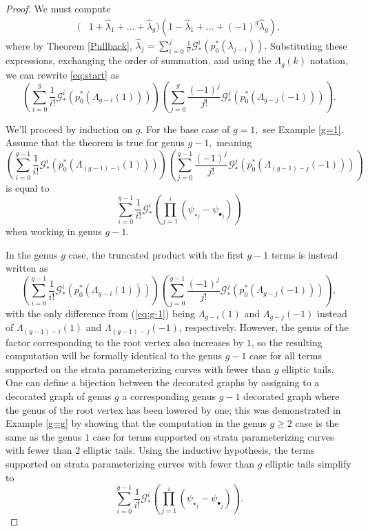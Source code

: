 \documentclass[leqno,12pt]{amsart}
\theoremstyle{remark}
\numberwithin{equation}{section}
\begin{document}
\begin{proof} We must compute
\begin{align} \label{eq:start}
     (&1 + \hat{\lambda}_1 + \dots + \hat{\lambda}_g)(1 - \hat{\lambda}_1 + \dots + (-1)^g\hat{\lambda}_g),
\end{align}
where by Theorem \ref{Pullback}, $\hat{\lambda}_j = \sum_{i=0}^j\frac{1}{i!}\mathcal{G}_*^i(p_0^*(\lambda_{j-i})).$ Substituting these expressions, exchanging the order of summation, and using the $\Lambda_{g}(k)$ notation, we can rewrite \eqref{eq:start}  as  
\begin{equation} \label{eq:big}
\left(\sum_{i=0}^g\frac{1}{i!}\mathcal{G}_*^i(p_0^*(\Lambda_{g-i}(1)))\right)\left(\sum_{j=0}^g\frac{(-1)^j}{j!}\mathcal{G}_*^j(p_0^*(\Lambda_{g-j}(-1)))\right). 
\end{equation}



We'll proceed by induction on $g.$ For the base case of $g = 1,$ see Example \ref{g=1}. Assume that the theorem is true for genus $g - 1,$ meaning 
\begin{equation}\label{eq:g-1}
    \left(\sum_{i=0}^{g-1}\frac{1}{i!}\mathcal{G}_*^i(p_0^*(\Lambda_{(g-1)-i}(1)))\right)\left(\sum_{j=0}^{g-1}\frac{(-1)^j}{j!}\mathcal{G}_*^j(p_0^*(\Lambda_{(g-1)-j}(-1)))\right)
\end{equation}
is equal to  
\begin{equation}\label{eq:induction}
    \sum_{i=0}^{g-1}\frac{1}{i!}\mathcal{G}_*^i\left(\prod_{j=1}^i(\psi_{\star_j}-\psi_{\bullet_j})\right)
\end{equation}
when working in genus $g-1$. 

In the genus $g$ case, the truncated product with the first $g-1$ terms is instead written as
$$
\left(\sum_{i=0}^{g-1}\frac{1}{i!}\mathcal{G}_*^i(p_0^*(\Lambda_{g-i}(1)))\right)\left(\sum_{j=0}^{g-1}\frac{(-1)^j}{j!}\mathcal{G}_*^j(p_0^*(\Lambda_{g-j}(-1)))\right),
$$ 
with the only difference from (\ref{eq:g-1}) being $\Lambda_{g-i}(1)$ and $\Lambda_{g-j}(-1)$ instead of $\Lambda_{(g-1)-i}(1)$ and $\Lambda_{(g-1)-j}(-1)$, respectively. However, the genus of the factor corresponding to the root vertex also increases by $1$, so the resulting computation will be formally identical to the genus $g-1$ case for all terms supported on the strata parameterizing curves with fewer than $g$ elliptic tails. One can define a bijection between the decorated graphs by assigning to a decorated graph of genus $g$ a corresponding genus $g-1$ decorated graph where the genus of the root vertex has been lowered by one;  this was demonstrated in Example \ref{g=g} by showing that the computation in the genus $g \geq 2$ case is the same as the genus $1$ case for terms supported on strata parameterizing curves with fewer than $2$ elliptic tails. Using the inductive hypothesis, the terms supported on strata parameterizing curves with fewer than $g$ elliptic tails simplify to
$$
\sum_{i=0}^{g-1}\frac{1}{i!}\mathcal{G}_*^i\left(\prod_{j=1}^i(\psi_{\star_j}-\psi_{\bullet_j})\right).
$$


\end{proof}
\end{document}

